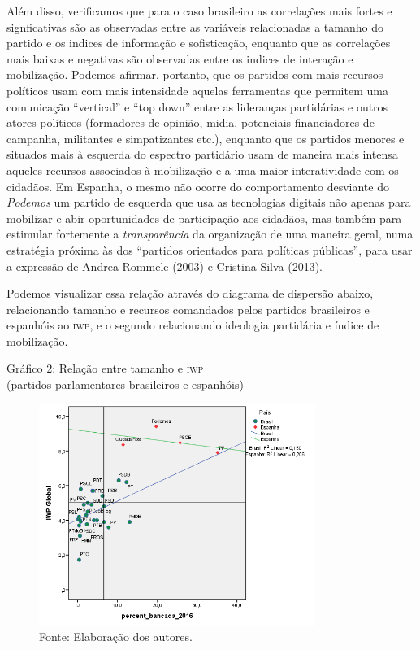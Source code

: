 Além disso, verificamos que para o caso brasileiro as correlações mais
fortes e signficativas são as observadas entre as variáveis relacionadas
a tamanho do partido e os indices de informação e sofisticação, enquanto
que as correlações mais baixas e negativas são observadas entre os
indices de interação e mobilização. Podemos afirmar, portanto, que os
partidos com mais recursos políticos usam com mais intensidade aquelas
ferramentas que permitem uma comunicação ``vertical'' e ``top down'' entre
as lideranças partidárias e outros atores políticos (formadores de
opinião, midia, potenciais financiadores de campanha, militantes e
simpatizantes etc.), enquanto que os partidos menores e situados mais à
esquerda do espectro partidário usam de maneira mais intensa aqueles
recursos associados à mobilização e a uma maior interatividade com os
cidadãos. Em Espanha, o mesmo não ocorre do comportamento desviante do
\emph{Podemos} um partido de esquerda que usa as tecnologias digitais
não apenas para mobilizar e abir oportunidades de participação aos
cidadãos, mas também para estimular fortemente a \emph{transparência} da
organização de uma maneira geral, numa estratégia próxima às dos
``partidos orientados para políticas públicas'', para usar a expressão
de Andrea Rommele (2003) e Cristina Silva (2013).

Podemos visualizar essa relação através do diagrama de dispersão abaixo,
relacionando tamanho e recursos comandados pelos partidos brasileiros e
espanhóis ao \textsc{iwp}, e o segundo relacionando ideologia partidária e índice
de mobilização.

\begin{center}
Gráfico 2: Relação entre tamanho e \textsc{iwp}\\ (partidos parlamentares
brasileiros e espanhóis)
\end{center}

\begin{figure}[!ht]
\centering
 \includegraphics[width=90mm]{./imgs/graf2.png}
\caption{Fonte: Elaboração dos autores.}
\end{figure}

